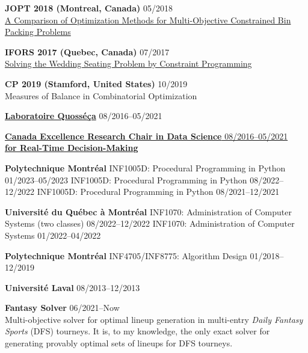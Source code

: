 \documentclass{memoir}
\begin{document}
\begin{list}{}
  \Item \textbf{JOPT 2018 (Montreal, Canada)} \hfill 05/2018 \\
  \href{https://symposia.gerad.ca/jopt2018/en/schedule?slot_id=1374}{A Comparison of Optimization Methods for Multi-Objective Constrained Bin Packing Problems}

  \Item \textbf{IFORS 2017 (Quebec, Canada)} \hfill 07/2017 \\
  \href{https://www.euro-online.org/conf/ifors2017/treat_abstract?paperid=1523}{Solving the Wedding Seating Problem by Constraint Programming}



  \Item \textbf{CP 2019 (Stamford, United States)} \hfill 10/2019 \\
  Measures of Balance in Combinatorial Optimization



  \Item \href{https://www.polymtl.ca/labo-quosseca/en/members/alumni/doctoral-students}{\textbf{Laboratoire Quosséça}} \hfill 08/2016--05/2021

  \Item \href{http://cerc-datascience.polymtl.ca/person/philippe-olivier}{\textbf{Canada Excellence Research Chair in Data Science} \hfill 08/2016--05/2021 \\ \textbf{for Real-Time Decision-Making}} 




  \Item \textbf{Polytechnique Montréal}
  \BulletItem INF1005D: Procedural Programming in Python \hfill 01/2023--05/2023
  \BulletItem INF1005D: Procedural Programming in Python \hfill 08/2022--12/2022
  \BulletItem INF1005D: Procedural Programming in Python \hfill 08/2021--12/2021

  \Item \textbf{Université du Québec à Montréal}
  \BulletItem INF1070: Administration of Computer Systems (two classes) \hfill 08/2022--12/2022
  \BulletItem INF1070: Administration of Computer Systems \hfill 01/2022--04/2022



  \Item \textbf{Polytechnique Montréal}
  \BulletItem INF4705/INF8775: Algorithm Design \hfill 01/2018--12/2019

  \Item \textbf{Université Laval} \hfill 08/2013--12/2013



  \Item \textbf{Fantasy Solver} \hfill 06/2021--Now \\
  Multi-objective solver for optimal lineup generation in multi-entry \emph{Daily Fantasy Sports} (DFS) tourneys. It is, to my knowledge, the only exact solver for generating provably optimal sets of lineups for DFS tourneys.
  
\end{list}
\par
\end{document}
